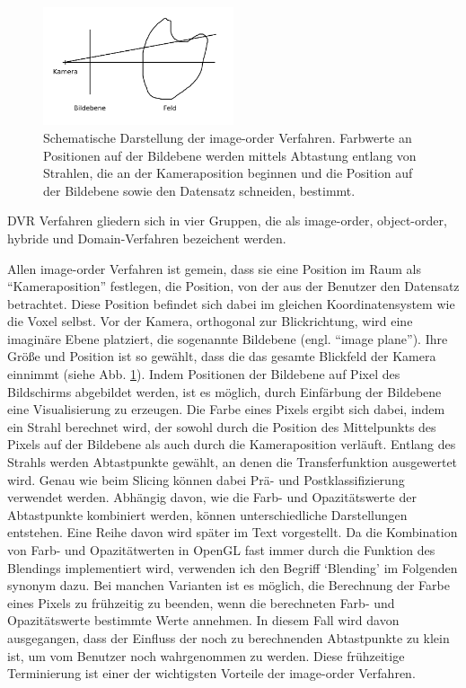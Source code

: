 \documentclass[a4paper,fontsize=12pt,toc=bib,halfparskip]{scrartcl}
\begin{document}
\begin{figure}
	\centering
	\includegraphics[width=0.5\textwidth]{pictures/DVR}
	\caption{Schematische Darstellung der image-order Verfahren. Farbwerte an Positionen auf der Bildebene werden mittels Abtastung entlang von Strahlen, die an der Kameraposition beginnen und die Position auf der Bildebene sowie den Datensatz schneiden, bestimmt.}
	\label{image-order}
\end{figure}

DVR Verfahren gliedern sich in vier Gruppen, die als image-order, object-order, hybride und Domain-Verfahren bezeichent werden.

Allen image-order Verfahren ist gemein, dass sie eine Position im Raum als ``Kameraposition'' festlegen, die Position, von der aus der Benutzer den Datensatz betrachtet. Diese Position befindet sich dabei im gleichen Koordinatensystem wie die Voxel selbst. Vor der Kamera, orthogonal zur Blickrichtung, wird eine imagin\"are Ebene platziert, die sogenannte Bildebene (engl. ``image plane''). Ihre Gr\"o{\ss}e und Position ist so gew\"ahlt, dass die das gesamte Blickfeld der Kamera einnimmt (siehe Abb. \ref{image-order}). Indem Positionen der Bildebene auf Pixel des Bildschirms abgebildet werden, ist es m\"oglich, durch Einf\"arbung der Bildebene eine Visualisierung zu erzeugen. Die Farbe eines Pixels ergibt sich dabei, indem ein Strahl berechnet wird, der sowohl durch die Position des Mittelpunkts des Pixels auf der Bildebene als auch durch die Kameraposition verl\"auft. Entlang des Strahls werden Abtastpunkte gew\"ahlt, an denen die Transferfunktion ausgewertet wird. Genau wie beim Slicing k\"onnen dabei Pr\"a- und Postklassifizierung verwendet werden. Abh\"angig davon, wie die Farb- und Opazit\"atswerte der Abtastpunkte kombiniert werden, k\"onnen unterschiedliche Darstellungen entstehen. Eine Reihe davon wird sp\"ater im Text vorgestellt. Da die Kombination von Farb- und Opazit\"atwerten in OpenGL fast immer durch die Funktion des Blendings implementiert wird, verwenden ich den Begriff `Blending' im Folgenden synonym dazu. Bei manchen Varianten ist es m\"oglich, die Berechnung der Farbe eines Pixels zu fr\"uhzeitig zu beenden, wenn die berechneten Farb- und Opazit\"atswerte bestimmte Werte annehmen. In diesem Fall wird davon ausgegangen, dass der Einfluss der noch zu berechnenden Abtastpunkte zu klein ist, um vom Benutzer noch wahrgenommen zu werden. Diese fr\"uhzeitige Terminierung ist einer der wichtigsten Vorteile der image-order Verfahren. 
\end{document}
